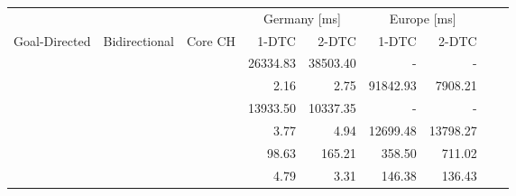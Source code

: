 \begin{tabular}{cccrrrrrr}
	\toprule
	              &               &         & \multicolumn{2}{c}{Germany [\si{\milli\second}]} & \multicolumn{2}{c}{Europe [\si{\milli\second}]}                 \\
	Goal-Directed & Bidirectional & Core CH & 1-DTC                                            & 2-DTC                                           & 1-DTC & 2-DTC \\
	\midrule
	\xmark        & \xmark        & \xmark  & 26334.83                                                & 38503.40                                               & -     & -     \\
	\cmark        & \xmark        & \xmark  & 2.16                                                & 2.75                                               & 91842.93     & 7908.21     \\
	\xmark        & \cmark        & \xmark  & 13933.50                                                & 10337.35                                               & -     & -     \\
	\cmark        & \cmark        & \xmark  & 3.77                                                & 4.94                                               & 12699.48     & 13798.27     \\
	\xmark        & \cmark        & \cmark  & 98.63                                                & 165.21                                               & 358.50     & 711.02     \\
	\cmark        & \cmark        & \cmark  & 4.79                                                & 3.31                                               & 146.38     & 136.43     \\
	\bottomrule
\end{tabular}